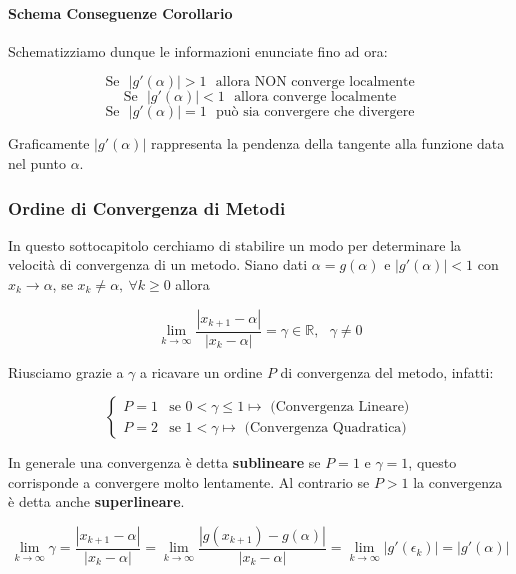 \documentclass{article}
\begin{document}
\paragraph{Schema Conseguenze Corollario} Schematizziamo dunque le informazioni enunciate fino ad ora:

\vspace*{10px}

\[ \boxed{ \text{Se} \:\:\: |g'(\alpha)| > 1 \:\:\: \text{allora NON converge localmente} } \]
\vspace*{5px}
\[ \boxed{ \text{Se} \:\:\: |g'(\alpha)| < 1 \:\:\: \text{allora converge localmente} } \]
\vspace*{5px}
\[ \boxed{ \text{Se} \:\:\: |g'(\alpha)| = 1 \:\:\: \text{può sia convergere che divergere} } \]
\vspace*{5px}

Graficamente $|g'(\alpha)|$ rappresenta la pendenza della tangente alla funzione data \\ nel punto $\alpha$.

\newpage

\subsubsection{Ordine di Convergenza di Metodi}

In questo sottocapitolo cerchiamo di stabilire un modo per determinare la velocità di convergenza di un metodo. Siano dati
$\alpha = g(\alpha)$ e $|g'(\alpha)| < 1$ con $x_{k} \rightarrow \alpha$, se $x_{k} \neq \alpha, \: \forall k \geq 0 $ allora

\[ \lim_{k \rightarrow \infty} \frac{|x_{k+1} - \alpha|}{|x_{k} - \alpha |} = \gamma \in \mathbb{R}, \:\:\: \gamma \neq 0 \]

Riusciamo grazie a $\gamma$ a ricavare un ordine $P$ di convergenza del metodo, infatti:

\[
\left\{
\begin{array}{rl}
    P = 1 & \text{se } 0 < \gamma \leq 1 \mapsto \text{ (Convergenza Lineare)} \\
    P = 2 & \text{se } 1 < \gamma \mapsto \text{ (Convergenza Quadratica)} 
\end{array}
\right.
\]

In generale una convergenza è detta \textbf{sublineare} se $P=1$ e $\gamma = 1$, questo corrisponde a convergere molto lentamente. Al contrario se $P>1$ la convergenza
è detta anche \textbf{superlineare}.

\[ \lim_{k \rightarrow \infty} \gamma = \frac{|x_{k+1} - \alpha|}{|x_{k} - \alpha|} = \lim_{k \rightarrow \infty} \frac{|g(x_{k+1}) - g(\alpha)|}{|x_{k} - \alpha|} = \lim_{k \rightarrow \infty} |g'(\epsilon_{k})| = |g'(\alpha)| \]
\end{document}

